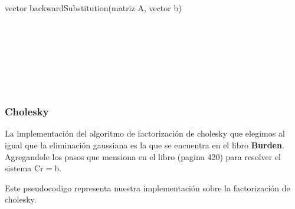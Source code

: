 \begin{algorithm}
    \begin{algorithmic}[1]\parskip=2mm
        \caption{vector backwardSubstitution(matriz A, vector b)}
        \\
        \\
        \\
        \\
        \\
        \\
    \end{algorithmic}
\end{algorithm}


\newpage
\subsubsection{Cholesky}

La implementación del algoritmo de factorizaci\'on de cholesky que elegimos al igual que la eliminaci\'on gaussiana es la que se encuentra en el libro \textbf{Burden}.
Agregandole los pasos que mensiona en el libro (pagina 420) para resolver el sistema Cr$=$b.

Este pseudocodigo representa nuestra implementaci\'on sobre la factorizaci\'on de cholesky.

